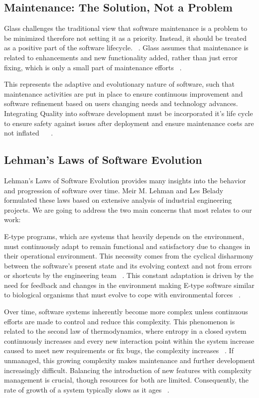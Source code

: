 \subsection{Maintenance: The Solution, Not a Problem}

Glass challenges the traditional view that software maintenance is a problem to be minimized therefore not setting it as a priority. Instead, it should be treated as a positive part of the software lifecycle. ~\cite{MaintenanceGlass1998}. Glass assumes that maintenance is related to enhancements and new functionality added, rather than just error fixing, which is only a small part of maintenance efforts ~\cite{MaintenanceGlass1998}.

This represents the adaptive and evolutionary nature of software, such that maintenance activities are put in place to ensure continuous improvement and software refinement based on users changing needs and technology advances. Integrating Quality into software development must be incorporated it's life cycle to ensure safety against issues after deployment and ensure maintenance costs are not inflated ~\cite{osterweil1996strategic} ~\cite{ManagingMaintenance1983}.
    
\subsection{Lehman’s Laws of Software Evolution}

Lehman’s Laws of Software Evolution provides many insights into the behavior and progression of software over time. Meir M. Lehman and Les Belady formulated these laws based on extensive analysis of industrial engineering projects. We are going to address the two main concerns that most relates to our work:

E-type programs, which are systems that heavily depends on the environment, must continuously adapt to remain functional and satisfactory due to changes in their operational environment. This necessity comes from the cyclical disharmony between the software's present state and its evolving context and not from errors or shortcuts by the engineering team ~\cite{Lehman1996Laws}. This constant adaptation is driven by the need for feedback and changes in the environment making E-type software similar to biological organisms that must evolve to cope with environmental forces ~\cite{LehmanLaws1980}.

Over time, software systems inherently become more complex unless continuous efforts are made to control and reduce this complexity. This phenomenon is related to the second law of thermodynamics, where entropy in a closed system continuously increases and every new interaction point within the system increase caused to meet new requirements or fix bugs, the complexity increases ~\cite{Lehman1996Laws}. If unmanaged, this growing complexity makes maintenance and further development increasingly difficult. Balancing the introduction of new features with complexity management is crucial, though resources for both are limited. Consequently, the rate of growth of a system typically slows as it ages ~\cite{Lehman1978ProgramsCS}.



